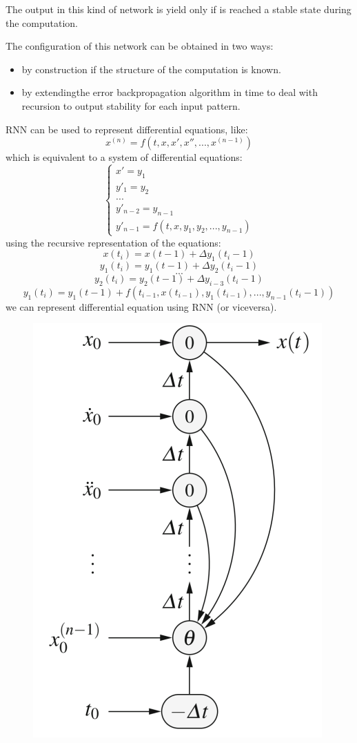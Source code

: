 \documentclass{article}
\begin{document}
The output in this kind of network is yield only if is reached a stable state during the
computation.

The configuration of this network can be obtained in two ways:
\begin{itemize}
    \item by construction if the structure of the computation is known.
    \item by extendingthe error backpropagation algorithm in time to deal with recursion
          to output stability for each input pattern.
\end{itemize}

RNN can be used to represent differential equations, like:
$$x^{(n)}=f(t,x,x',x'',...,x^{(n-1)})$$
which is equivalent to a system of differential equations:
\[
    \begin{cases}
        x'=y_1           \\
        y'_1= y_2        \\
        ...              \\
        y'_{n-2}=y_{n-1} \\
        y'_{n-1}=f(t,x,y_1,y_2,...,y_{n-1})
    \end{cases}
\]
using the recursive representation of the equations:
$$    x(t_i)=x(t-1)+\Delta y_1(t_i -1)$$
$$    y_1(t_i)=y_1(t-1)+\Delta y_2(t_i -1)$$
$$   ...$$
$$y_2(t_i)=y_2(t-1)+\Delta y_{i-3}(t_i -1)$$
$$y_1(t_i)=y_1(t-1)+ f(t_{i-1}, x(t_{i-1}), y_1(t_{i-1}),..., y_{n-1}(t_i -1))$$
we can represent differential equation using RNN (or viceversa).
\begin{figure}[H]
    \centering
    \includegraphics[scale=0.5]{images/RNN_diff_eq.png}
\end{figure}
\end{document}
